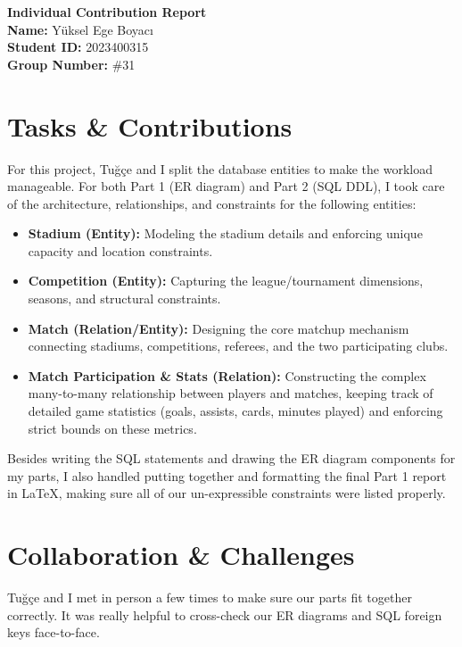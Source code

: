 \documentclass[12pt, a4paper]{article}
\begin{document}
\begin{center}
    \Large\textbf{Individual Contribution Report} \\
    \vspace{0.5cm}
    \normalsize
    \textbf{Name:} Yüksel Ege Boyacı \\
    \textbf{Student ID:} 2023400315 \\
    \textbf{Group Number:} \#31
\end{center}

\vspace{0.5cm}

\section*{Tasks \& Contributions}
For this project, Tuğçe and I split the database entities to make the workload manageable. For both Part 1 (ER diagram) and Part 2 (SQL DDL), I took care of the architecture, relationships, and constraints for the following entities:
\begin{itemize}
    \item \textbf{Stadium (Entity):} Modeling the stadium details and enforcing unique capacity and location constraints.
    \item \textbf{Competition (Entity):} Capturing the league/tournament dimensions, seasons, and structural constraints.
    \item \textbf{Match (Relation/Entity):} Designing the core matchup mechanism connecting stadiums, competitions, referees, and the two participating clubs.
    \item \textbf{Match Participation \& Stats (Relation):} Constructing the complex many-to-many relationship between players and matches, keeping track of detailed game statistics (goals, assists, cards, minutes played) and enforcing strict bounds on these metrics.
\end{itemize}
Besides writing the SQL statements and drawing the ER diagram components for my parts, I also handled putting together and formatting the final Part 1 report in LaTeX, making sure all of our un-expressible constraints were listed properly.

\section*{Collaboration \& Challenges}
Tuğçe and I met in person a few times to make sure our parts fit together correctly. It was really helpful to cross-check our ER diagrams and SQL foreign keys face-to-face.
\end{document}
